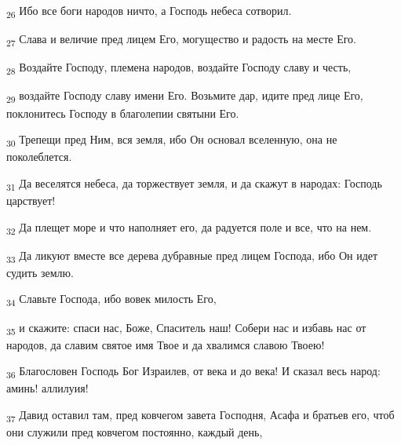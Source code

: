 \begin{tcolorbox}
\textsubscript{26} Ибо все боги народов ничто, а Господь небеса сотворил.
\end{tcolorbox}
\begin{tcolorbox}
\textsubscript{27} Слава и величие пред лицем Его, могущество и радость на месте Его.
\end{tcolorbox}
\begin{tcolorbox}
\textsubscript{28} Воздайте Господу, племена народов, воздайте Господу славу и честь,
\end{tcolorbox}
\begin{tcolorbox}
\textsubscript{29} воздайте Господу славу имени Его. Возьмите дар, идите пред лице Его, поклонитесь Господу в благолепии святыни Его.
\end{tcolorbox}
\begin{tcolorbox}
\textsubscript{30} Трепещи пред Ним, вся земля, ибо Он основал вселенную, она не поколеблется.
\end{tcolorbox}
\begin{tcolorbox}
\textsubscript{31} Да веселятся небеса, да торжествует земля, и да скажут в народах: Господь царствует!
\end{tcolorbox}
\begin{tcolorbox}
\textsubscript{32} Да плещет море и что наполняет его, да радуется поле и все, что на нем.
\end{tcolorbox}
\begin{tcolorbox}
\textsubscript{33} Да ликуют вместе все дерева дубравные пред лицем Господа, ибо Он идет судить землю.
\end{tcolorbox}
\begin{tcolorbox}
\textsubscript{34} Славьте Господа, ибо вовек милость Его,
\end{tcolorbox}
\begin{tcolorbox}
\textsubscript{35} и скажите: спаси нас, Боже, Спаситель наш! Собери нас и избавь нас от народов, да славим святое имя Твое и да хвалимся славою Твоею!
\end{tcolorbox}
\begin{tcolorbox}
\textsubscript{36} Благословен Господь Бог Израилев, от века и до века! И сказал весь народ: аминь! аллилуия!
\end{tcolorbox}
\begin{tcolorbox}
\textsubscript{37} Давид оставил там, пред ковчегом завета Господня, Асафа и братьев его, чтоб они служили пред ковчегом постоянно, каждый день,
\end{tcolorbox}
